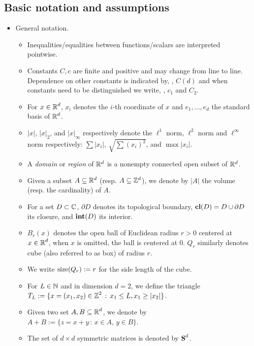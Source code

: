 \documentclass[12pt]{amsart}
\numberwithin{equation}{section}
\begin{document}
	\subsection{Basic notation and assumptions} \label{subsec:notation}
	\begin{itemize}
		\item General notation.
		\begin{itemize} 
			\item Inequalities/equalities between functions/scalars are interpreted pointwise.
			\item Constants $C, c$ are finite and positive and may change from line to line. Dependence on other constants is indicated by, \eg, $C(d)$
			and when constants need to be distinguished we write, \eg, $c_1$ and $C_2$. 
			\item For $x \in \operatorname{\mathbb{R}}^d$, $x_i$ denotes the $i$-th coordinate of $x$ and $e_1, \ldots, e_d$ the standard basis of $\operatorname{\mathbb{R}}^d$.
			\item $|x|$, $|x|_2$, and $|x|_{\infty}$ respectively denote the $\ell^1$ norm, $\ell^2$ norm and $\ell^{\infty}$ norm respectively: $\sum |x_i|$, $\sqrt{\sum (x_i)^2}$, and $\max |x_i|$.
			\item A \emph{domain} or \emph{region} of $\mathbb{R}^d$ is a nonempty connected open subset of $\mathbb{R}^d$.
			\item Given a subset $A \subseteq \mathbb{R}^d$ (resp. $A \subseteq \mathbb{Z}^d$), we denote by $\left| A \right|$ the volume (resp. the cardinality) of $A$.
			\item For a set $D \subset \operatorname{\mathbb{C}}$, $\partial D$ denotes its topological boundary, $\mathbf{cl}(D) = D \cup \partial D$ its closure, 
			and $\operatorname{\mathbf{int}}(D)$ its interior. 
			\item $B_r(x)$ denotes the open ball of Euclidean radius $r > 0$ centered at $x \in \operatorname{\mathbb{R}}^d$, when $x$ is omitted, the ball is centered at 0. $Q_r$ similarly 
			denotes cube (also referred to as box) of radius $r$. 
			\item We write $\mathrm{size}(Q_r) := r$ for the side length of the cube.
			\item For $L \in \operatorname{\mathbb{N}}$ and in dimension $d = 2$, we define the triangle $T_L := \{ x = (x_1 , x_2) \in \operatorname{\mathbb{Z}}^2 \, : \, x_1 \leq L, x_1 \geq |x_2|\}$.
			\item Given two set $A,B \subseteq \operatorname{\mathbb{R}}^d$, we denote by $A + B := \{ z = x + y \, : \, x \in A , \, y \in B \}.$
			\item The set of $d \times d$ symmetric matrices is denoted by $\operatorname{{\mbox{\bf S}}}^d$.
		\end{itemize}
		

\end{itemize}
\end{document}
